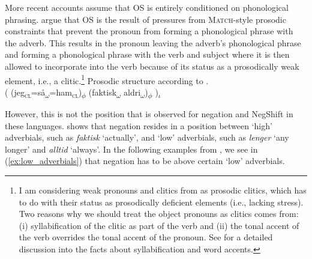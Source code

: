 \documentclass[12pt, letterpaper]{article}
\newcommand{\sub}[1]{\textsubscript{#1}}
\begin{document}
More recent accounts \citep[e.g.,][]{erteschik-shirVariationMainlandScandinavian2020,brinkerhoffMATCHINGPhrasesNorwegian2021} assume that OS is entirely conditioned on phonological phrasing. \citet{brinkerhoffMATCHINGPhrasesNorwegian2021} argue that OS is the result of pressures from \textsc{Match}-style prosodic constraints \citep{selkirkClauseIntonationalPhrase2009,selkirkSyntaxPhonologyInterface2011} that prevent the pronoun from forming a phonological phrase with the adverb. This results in the pronoun leaving the adverb's phonological phrase and forming a phonological phrase with the verb and subject where it is then allowed to incorporate into the verb because of its status as a prosodically weak element, i.e., a clitic.\footnote{I am considering weak pronouns and clitics from \citet{cardinalettiTypologyStructuralDeficiency1999} as prosodic clitics, which has to do with their status as prosodically deficient elements (i.e., lacking stress). Two reasons why we should treat the object pronouns as clitics comes from: (i) syllabification of the clitic as part of the verb and (ii) the tonal accent of the verb overrides the tonal accent of the pronoun. See \citet{myrbergProsodicWordSwedish2013,myrbergProsodicHierarchySwedish2015,riadPhonologySwedish2014} for a detailed discussion into the facts about syllabification and word accents. } 
\newline
\ea Prosodic structure according to \citet{brinkerhoffMATCHINGPhrasesNorwegian2021}.\\
( (jeg\sub{\textsc{cl}}=så\sub{$\omega$}=ham\sub{\textsc{cl}})\sub{$\phi$} (faktisk\sub{$\omega$} aldri\sub{$\omega$})\sub{$\phi$} )\sub{$\iota$}
\z 

However, this is not the position that is observed for negation and NegShift in these languages. \citet{nilsenAdverbsAshift1997} shows that negation resides in a position between `high' adverbials, such as \emph{faktisk} `actually', and `low' adverbials, such as \emph{lenger} `any longer' and \emph{alltid} `always'. In the following examples from \citet{nilsenAdverbsAshift1997}, we see in (\ref{ex:low_adverbials}) that negation has to be above certain `low' adverbials.
\end{document}
